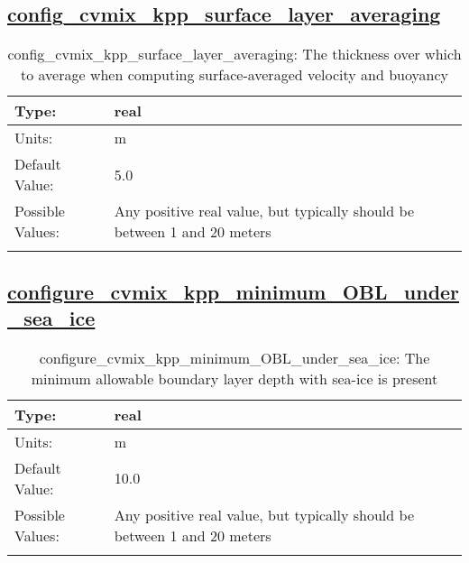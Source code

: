 \subsection[config\_cvmix\_kpp\_surface\_layer\_averaging]{\hyperref[sec:nm_tab_cvmix]{config\_cvmix\_kpp\_surface\_layer\_averaging}}
\label{subsec:nm_sec_config_cvmix_kpp_surface_layer_averaging}
\begin{center}
\begin{longtable}{| p{2.0in} || p{4.0in} |}
    \hline
    Type: & real \\
    \hline
    Units: & \si{m} \\
    \hline
    Default Value: & 5.0 \\
    \hline
    Possible Values: & Any positive real value, but typically should be between 1 and 20 meters \\
    \hline
    \caption{config\_cvmix\_kpp\_surface\_layer\_averaging: The thickness over which to average when computing surface-averaged velocity and buoyancy}
\end{longtable}
\end{center}
\subsection[configure\_cvmix\_kpp\_minimum\_OBL\_under\_sea\_ice]{\hyperref[sec:nm_tab_cvmix]{configure\_cvmix\_kpp\_minimum\_OBL\_under\_sea\_ice}}
\label{subsec:nm_sec_configure_cvmix_kpp_minimum_OBL_under_sea_ice}
\begin{center}
\begin{longtable}{| p{2.0in} || p{4.0in} |}
    \hline
    Type: & real \\
    \hline
    Units: & \si{m} \\
    \hline
    Default Value: & 10.0 \\
    \hline
    Possible Values: & Any positive real value, but typically should be between 1 and 20 meters \\
    \hline
    \caption{configure\_cvmix\_kpp\_minimum\_OBL\_under\_sea\_ice: The minimum allowable boundary layer depth with sea-ice is present}
\end{longtable}
\end{center}
